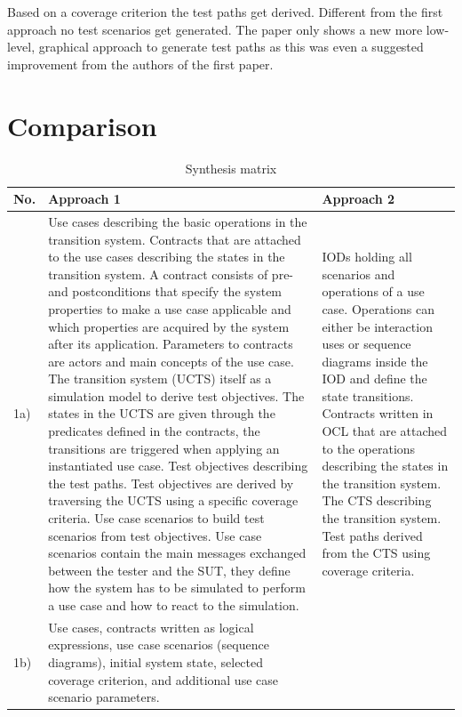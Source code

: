 Based on a coverage criterion the test paths get derived. Different from the first approach no test scenarios get generated. The paper only shows a new more low-level, graphical approach to generate test paths as this was even a suggested improvement from the authors of the first paper. 

\newpage
\section{Comparison} \label{comparison}
\begin{small}
\begin{longtable}[h]{p{0.45cm}|p{}|p{}}
	\caption{Synthesis matrix}
	\label{tab3:synthesismatrix}
	\\    %
	\hline
	\textbf{No.} & \textbf{Approach 1} & \textbf{Approach 2} \\
	\hline
	1a) & 
	Use cases describing the basic operations in the transition system. Contracts that are attached to the use cases describing the states in the transition system. A contract consists of pre- and postconditions that specify the system properties to make a use case applicable and which properties are acquired by the system after its application. Parameters to contracts are actors and main concepts of the use case. The transition system (UCTS) itself as a simulation model to derive test objectives. The states in the UCTS are given through the predicates defined in the contracts, the transitions are triggered when applying an instantiated use case. Test objectives describing the test paths. Test objectives are derived by traversing the UCTS using a specific coverage criteria. Use case scenarios to build test scenarios from test objectives. Use case scenarios contain the main messages exchanged between the tester and the SUT, they define how the system has to be simulated to perform a use case and how to react to the simulation. & 
	IODs holding all scenarios and operations of a use case. Operations can either be interaction uses or sequence diagrams inside the IOD and define the state transitions. Contracts written in OCL that are attached to the operations describing the states in the transition system. The CTS describing the transition system. Test paths derived from the CTS using coverage criteria.  \\
	\hline
	1b) & 
	Use cases, contracts written as logical expressions, use case scenarios (sequence diagrams), initial system state, selected coverage criterion, and additional use case scenario parameters. & 

\end{longtable}
\end{small}
